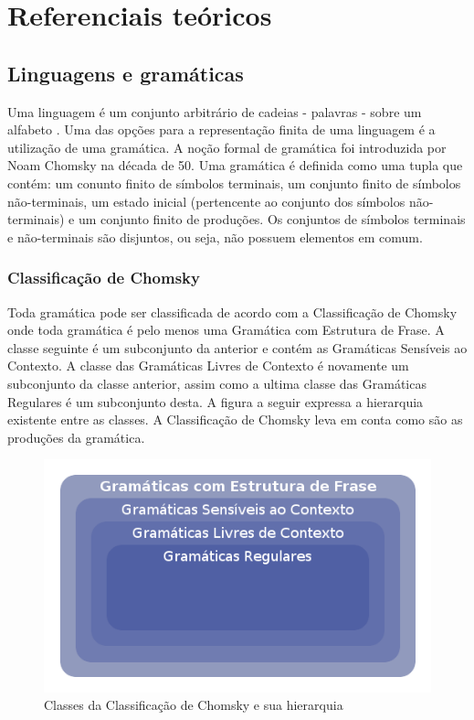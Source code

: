 \part{Referenciais teóricos}

\chapter{Linguagens e gramáticas}
Uma linguagem é um conjunto arbitrário de cadeias - palavras - sobre um alfabeto \cite{lang}.
Uma das opções para a representação finita de uma linguagem é a utilização de uma gramática.
A noção formal de gramática foi introduzida por Noam Chomsky na década de 50. Uma gramática é definida como uma tupla que contém: 
um conunto finito de símbolos terminais, um conjunto finito de símbolos não-terminais, um estado inicial (pertencente ao conjunto dos símbolos não-terminais) e 
um conjunto finito de produções. Os conjuntos de símbolos terminais e não-terminais são disjuntos, ou seja, não possuem elementos em comum. \cite{gram}

\section{Classificação de Chomsky}
Toda gramática pode ser classificada de acordo com a Classificação de Chomsky onde toda gramática é pelo menos uma Gramática com Estrutura de Frase. A classe seguinte é um subconjunto da anterior e contém as Gramáticas Sensíveis ao Contexto. A classe das Gramáticas Livres de Contexto é novamente um subconjunto da classe anterior, assim como a ultima classe das Gramáticas Regulares é um subconjunto desta. A figura a seguir expressa a hierarquia existente entre as classes. A Classificação de Chomsky leva em conta como são as produções da gramática.

	
\begin{figure}[H]
	\caption{\label{gram_cls}Classes da Classificação de Chomsky e sua hierarquia}
	\begin{center}
	    \includegraphics[scale=0.5]{driagrama_classes_gramaticas.png}
	\end{center}
\end{figure}

